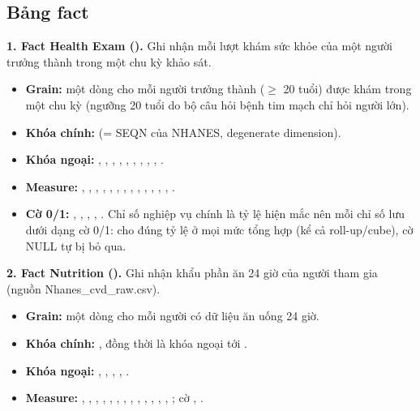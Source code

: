 \subsection{Bảng fact}
\textbf{1. Fact Health Exam ().} Ghi nhận mỗi lượt khám sức khỏe của một người trưởng thành trong một chu kỳ khảo sát.
\begin{itemize}
\item \textbf{Grain:} một dòng cho mỗi người trưởng thành ($\geq$ 20 tuổi) được khám trong một chu kỳ (ngưỡng 20 tuổi do bộ câu hỏi bệnh tim mạch chỉ hỏi người lớn).
\item \textbf{Khóa chính:}  (= SEQN của NHANES, degenerate dimension).
\item \textbf{Khóa ngoại:} , , , , , , , , , .
\item \textbf{Measure:} , , , , , , , , , , , , , .
\item \textbf{Cờ 0/1:} , , , , . Chỉ số nghiệp vụ chính là tỷ lệ hiện mắc nên mỗi chỉ số lưu dưới dạng cờ 0/1:  cho đúng tỷ lệ ở mọi mức tổng hợp (kể cả roll-up/cube), cờ NULL tự bị bỏ qua.
\end{itemize}
\textbf{2. Fact Nutrition ().} Ghi nhận khẩu phần ăn 24 giờ của người tham gia (nguồn Nhanes\_cvd\_raw.csv).
\begin{itemize}
\item \textbf{Grain:} một dòng cho mỗi người có dữ liệu ăn uống 24 giờ.
\item \textbf{Khóa chính:} , đồng thời là khóa ngoại tới .
\item \textbf{Khóa ngoại:} , , , , .
\item \textbf{Measure:} , , , , , , , , , , , , , ; cờ , .
\end{itemize}

